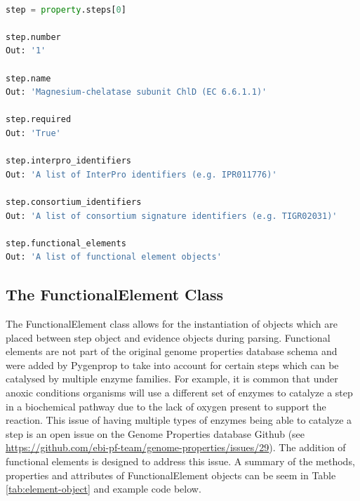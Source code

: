 \begin{lstlisting}[language=Python]

step = property.steps[0]
	
step.number
Out: '1'

step.name
Out: 'Magnesium-chelatase subunit ChlD (EC 6.6.1.1)'

step.required
Out: 'True'

step.interpro_identifiers
Out: 'A list of InterPro identifiers (e.g. IPR011776)'

step.consortium_identifiers 
Out: 'A list of consortium signature identifiers (e.g. TIGR02031)'

step.functional_elements
Out: 'A list of functional element objects'

\end{lstlisting}

\subsection{The FunctionalElement Class}

The FunctionalElement class allows for the instantiation of objects which are placed between step object and evidence objects during parsing. Functional elements are not part of the original genome properties database schema and were added by Pygenprop to take into account for certain steps which can be catalysed by multiple enzyme families. For example, it is common that under anoxic conditions organisms will use a different set of enzymes to catalyze a step in a biochemical pathway due to the lack of oxygen present to support the reaction. This issue of having multiple types of enzymes being able to catalyze a step is an open issue on the Genome Properties database Github (see \href{https://github.com/ebi-pf-team/genome-properties/issues/29}{https://github.com/ebi-pf-team/genome-properties/issues/29}). The addition of functional elements is designed to address this issue. A summary of the methods, properties and attributes of FunctionalElement objects can be seem in Table \ref{tab:element-object} and example code below.

